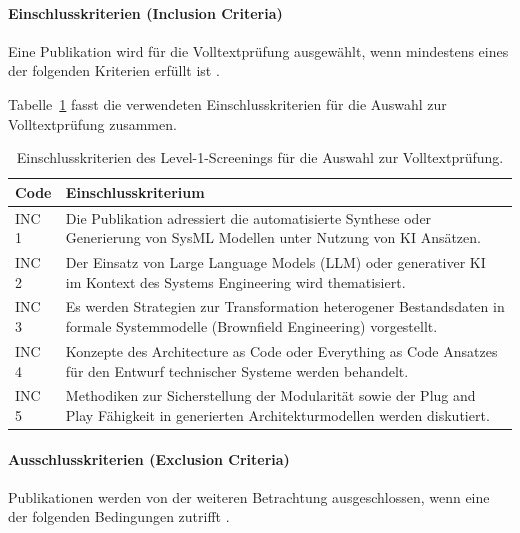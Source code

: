 \paragraph{Einschlusskriterien (Inclusion Criteria)}

Eine Publikation wird für die Volltextprüfung ausgewählt, wenn mindestens eines der folgenden Kriterien erfüllt ist \cite{Higgins.2019b}.

Tabelle~\ref{tab:inc_criteria} fasst die verwendeten Einschlusskriterien
für die Auswahl zur Volltextprüfung zusammen.

\begin{table}[h]
\caption[Einschlusskriterien des Level-1-Screenings]{
Einschlusskriterien des Level-1-Screenings für die Auswahl zur
Volltextprüfung.}
\label{tab:inc_criteria}
\centering
\begin{tabular}{|l|p{10cm}|}
\hline
\textbf{Code} & \textbf{Einschlusskriterium} \\ \hline
INC 1 & Die Publikation adressiert die automatisierte Synthese oder Generierung von SysML Modellen unter Nutzung von KI Ansätzen. \\ \hline
INC 2 & Der Einsatz von Large Language Models (LLM) oder generativer KI im Kontext des Systems Engineering wird thematisiert. \\ \hline
INC 3 & Es werden Strategien zur Transformation heterogener Bestandsdaten in formale Systemmodelle (Brownfield Engineering) vorgestellt. \\ \hline
INC 4 & Konzepte des Architecture as Code oder Everything as Code Ansatzes für den Entwurf technischer Systeme werden behandelt. \\ \hline
INC 5 & Methodiken zur Sicherstellung der Modularität sowie der Plug and Play Fähigkeit in generierten Architekturmodellen werden diskutiert. \\ \hline
\end{tabular}
\end{table}
\newpage
\paragraph{Ausschlusskriterien (Exclusion Criteria)}

Publikationen werden von der weiteren Betrachtung ausgeschlossen, wenn eine der folgenden Bedingungen zutrifft \cite{Petticrew.2012}.

